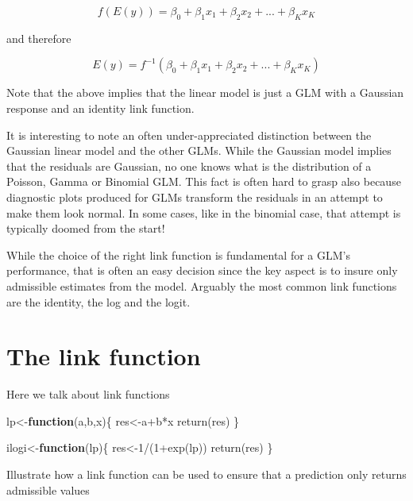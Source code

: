 \documentclass[
]{book}
\newenvironment{Shaded}{\begin{snugshade}}{\end{snugshade}}
\newcommand{\ControlFlowTok}[1]{\textcolor[rgb]{0.13,0.29,0.53}{\textbf{#1}}}
\newcommand{\DecValTok}[1]{\textcolor[rgb]{0.00,0.00,0.81}{#1}}
\newcommand{\FunctionTok}[1]{\textcolor[rgb]{0.00,0.00,0.00}{#1}}
\newcommand{\NormalTok}[1]{#1}
\newcommand{\OtherTok}[1]{\textcolor[rgb]{0.56,0.35,0.01}{#1}}
\newcommand{\SpecialCharTok}[1]{\textcolor[rgb]{0.00,0.00,0.00}{#1}}
\begin{document}
\[f(E(y))=\beta_0+\beta_1x_1+\beta_2x_2+...+\beta_Kx_K\]

and therefore

\[E(y)=f^{-1}(\beta_0+\beta_1x_1+\beta_2x_2+...+\beta_Kx_K)\]

Note that the above implies that the linear model is just a GLM with a Gaussian response and an identity link function.

It is interesting to note an often under-appreciated distinction between the Gaussian linear model and the other GLMs. While the Gaussian model implies that the residuals are Gaussian, no one knows what is the distribution of a Poisson, Gamma or Binomial GLM. This fact is often hard to grasp also because diagnostic plots produced for GLMs transform the residuals in an attempt to make them look normal. In some cases, like in the binomial case, that attempt is typically doomed from the start!

While the choice of the right link function is fundamental for a GLM's performance, that is often an easy decision since the key aspect is to insure only admissible estimates from the model. Arguably the most common link functions are the identity, the log and the logit.

\hypertarget{the-link-function}{%
\section{The link function}\label{the-link-function}}

Here we talk about link functions

\begin{Shaded}
\begin{Highlighting}[]
\NormalTok{lp}\OtherTok{\textless{}{-}}\ControlFlowTok{function}\NormalTok{(a,b,x)\{}
\NormalTok{  res}\OtherTok{\textless{}{-}}\NormalTok{a}\SpecialCharTok{+}\NormalTok{b}\SpecialCharTok{*}\NormalTok{x}
  \FunctionTok{return}\NormalTok{(res)}
\NormalTok{\}}

\NormalTok{ilogi}\OtherTok{\textless{}{-}}\ControlFlowTok{function}\NormalTok{(lp)\{}
\NormalTok{  res}\OtherTok{\textless{}{-}}\DecValTok{1}\SpecialCharTok{/}\NormalTok{(}\DecValTok{1}\SpecialCharTok{+}\FunctionTok{exp}\NormalTok{(lp))}
  \FunctionTok{return}\NormalTok{(res)}
\NormalTok{\}}
\end{Highlighting}
\end{Shaded}

Illustrate how a link function can be used to ensure that a prediction only returns admissible values
\end{document}
